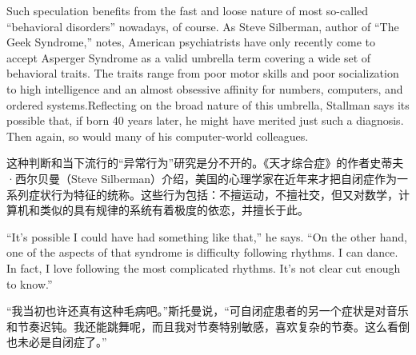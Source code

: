 \fi

\ifdefined\eng
Such speculation benefits from the fast and loose nature of most so-called ``behavioral disorders'' nowadays, of course. As Steve Silberman, author of ``The Geek Syndrome,'' notes, American psychiatrists have only recently come to accept Asperger Syndrome as a valid umbrella term covering a wide set of behavioral traits. The traits range from poor motor skills and poor socialization to high intelligence and an almost obsessive affinity for numbers, computers, and ordered systems.Reflecting on the broad nature of this umbrella, Stallman says its possible that, if born 40 years later, he might have merited just such a diagnosis. Then again, so would many of his computer-world colleagues.
\fi

\ifdefined\chs
这种判断和当下流行的``异常行为''研究是分不开的。《天才综合症》的作者史蒂夫·西尔贝曼（Steve Silberman）介绍，美国的心理学家在近年来才把自闭症作为一系列症状行为特征的统称。这些行为包括：不擅运动，不擅社交，但又对数学，计算机和类似的具有规律的系统有着极度的依恋，并擅长于此。
\fi

\ifdefined\eng
``It's possible I could have had something like that,'' he says. ``On the other hand, one of the aspects of that syndrome is difficulty following rhythms. I can dance. In fact, I love following the most complicated rhythms. It's not clear cut enough to know.''  %
\fi

\ifdefined\chs
``我当初也许还真有这种毛病吧。''斯托曼说，``可自闭症患者的另一个症状是对音乐和节奏迟钝。我还能跳舞呢，而且我对节奏特别敏感，喜欢复杂的节奏。这么看倒也未必是自闭症了。''%
\fi

